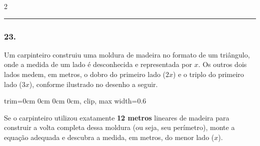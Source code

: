 \begin{multicols*}{2}
\par\vspace{\espacoQuestao}

\noindent\textcolor{CorLinha}{\rule{\linewidth}{0.5pt}} 
\par\vspace{\espacoPreQuestao}
\subsubsection*{23.} 
\begin{enunciadoLiteral}
Um carpinteiro construiu uma moldura de madeira no formato de um triângulo, onde a medida de um lado é desconhecida e representada por $x$. Os outros dois lados medem, em metros, o dobro do primeiro lado ($2x$) e o triplo do primeiro lado ($3x$), conforme ilustrado no desenho a seguir.

\begin{center}
\begin{adjustbox}{trim=0cm 0cm 0cm 0cm, clip, max width=0.6\linewidth}
\end{adjustbox}
\end{center}

Se o carpinteiro utilizou exatamente \textbf{12 metros} lineares de madeira para construir a volta completa dessa moldura (ou seja, seu perímetro), monte a equação adequada e descubra a medida, em metros, do menor lado ($x$).
\end{enunciadoLiteral}


\end{multicols*}
